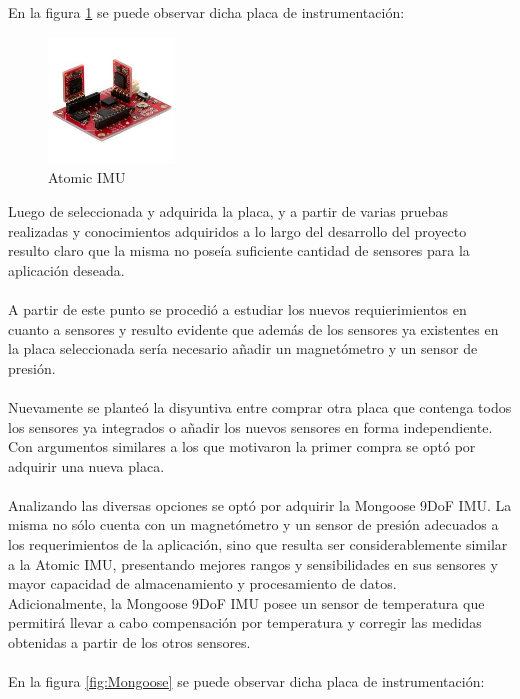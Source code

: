 \documentclass[main]{subfiles}
\begin{document}
En la figura \ref{fig:IMU} se puede observar dicha placa de instrumentaci\'on:

\begin{figure}[H]
	\centering
	\includegraphics[width=0.3\textwidth]{./pics_eleccion_hardware/IMU.jpg}
	\caption{Atomic IMU}
	\label{fig:IMU}
\end{figure}

Luego de seleccionada y adquirida la placa, y a partir de varias pruebas realizadas y conocimientos adquiridos a lo largo del desarrollo del proyecto resulto claro que la misma no pose\'ia suficiente cantidad de sensores para la aplicaci\'on deseada.\\
\\
A partir de este punto se procedi\'o a estudiar los nuevos requierimientos en cuanto a sensores y resulto evidente que adem\'as de los sensores ya existentes en la placa seleccionada ser\'ia necesario a\~nadir un magnet\'ometro y un sensor de presi\'on.\\
\\
Nuevamente se plante\'o la disyuntiva entre comprar otra placa que contenga todos los sensores ya integrados o a\~nadir los nuevos sensores en forma independiente. Con argumentos similares a los que motivaron la primer compra se opt\'o por adquirir una nueva placa.\\
\\
Analizando las diversas opciones se opt\'o por adquirir la Mongoose 9DoF IMU. La misma no s\'olo cuenta con un magnet\'ometro y un sensor de presi\'on adecuados a los requerimientos de la aplicaci\'on, sino que resulta ser considerablemente similar a la Atomic IMU, presentando mejores rangos y sensibilidades en sus sensores y mayor capacidad de almacenamiento y procesamiento de datos.\\
Adicionalmente, la Mongoose 9DoF IMU posee un sensor de temperatura que permitir\'a llevar a cabo compensaci\'on por temperatura y corregir las medidas obtenidas a partir de los otros sensores.\\
\\
En la figura \ref{fig:Mongoose} se puede observar dicha placa de instrumentaci\'on:
\end{document}
